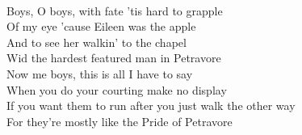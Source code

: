 ~\\
Boys, O boys, with fate 'tis hard to grapple \\
Of my eye 'cause Eileen was the apple \\
And to see her walkin' to the chapel \\
Wid the hardest featured man in Petravore \\
Now me boys, this is all I have to say \\
When you do your courting make no display\\
If you want them to run after you just walk the other way \\
For they're mostly like the Pride of Petravore \\